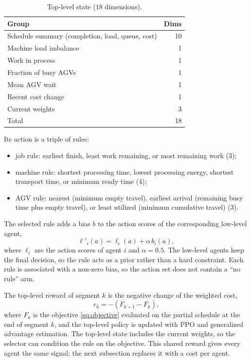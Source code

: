 \begin{table}[t]
\centering
\caption{Top-level state ($18$ dimensions).}
\label{tab:topstate}
\begin{tabular}{lr}
\toprule
Group & Dims \\
\midrule
Schedule summary (completion, load, queue, cost) & 10 \\
Machine load imbalance & 1 \\
Work in process & 1 \\
Fraction of busy AGVs & 1 \\
Mean AGV wait & 1 \\
Recent cost change & 1 \\
Current weights & 3 \\
\midrule
Total & 18 \\
\bottomrule
\end{tabular}
\end{table}

Its action is a triple of rules:
\begin{itemize}
\item job rule: earliest finish, least work remaining, or most
remaining work (3);
\item machine rule: shortest processing time, lowest processing energy,
shortest transport time, or minimum ready time (4);
\item AGV rule: nearest (minimum empty travel), earliest arrival (remaining
busy time plus empty travel), or least utilized (minimum cumulative travel)
(3).
\end{itemize}

The selected rule adds a bias $b$ to the action scores of the corresponding
low-level agent,
\begin{equation}
\ell'_{i}(a)=\ell_{i}(a)+\alpha\,b_{i}(a),
\end{equation}
where $\ell_i$ are the action scores of agent $i$ and $\alpha=0.5$. The low-level
agents keep the final decision, so the rule acts as a prior rather than a hard
constraint. Each rule is associated with a non-zero bias, so the action set does not contain a ``no rule'' arm.

The top-level reward of segment $k$ is the negative change of the weighted
cost,
\begin{equation}
r_k=-\left(F_{k+1}-F_k\right),
\end{equation}
where $F_k$ is the objective \eqref{eq:objective} evaluated on the partial
schedule at the end of segment $k$, and the top-level policy is updated with
PPO and generalized advantage estimation. The top-level state includes the current weights, so the selector
can condition the rule on the objective. This shared reward gives every agent
the same signal; the next subsection replaces it with a cost per agent.

